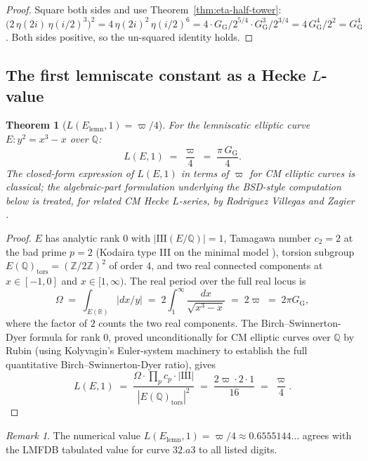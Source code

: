 \documentclass[11pt]{article}
\newtheorem{theorem}{Theorem}[section]
\theoremstyle{definition}
\theoremstyle{remark}
\newtheorem*{remark}{Remark}
\newcommand{\GG}{G_{\!\scriptscriptstyle\mathrm{G}}}
\newcommand{\Z}{\mathbb{Z}}
\newcommand{\Q}{\mathbb{Q}}
\newcommand{\R}{\mathbb{R}}
\newcommand{\Sha}{\mathrm{III}}
\begin{document}
\begin{proof}
Square both sides and use Theorem~\ref{thm:eta-half-tower}:
$\bigl(2\,\eta(2i)\,\eta(i/2)^{3}\bigr)^{2}
   = 4\,\eta(2i)^{2}\,\eta(i/2)^{6}
   = 4 \cdot \GG/2^{5/4} \cdot \GG^{3}/2^{3/4}
   = 4\,\GG^{4}/2^{2} = \GG^{4}$.
Both sides positive, so the un-squared identity holds.
\end{proof}

\subsection{The first lemniscate constant as a Hecke $L$-value}\label{sec:Lvalue}

\begin{theorem}[$L(E_{\mathrm{lemn}}, 1) = \varpi/4$]\label{thm:Lvalue}
For the lemniscatic elliptic curve $E: y^2 = x^3 - x$ over $\Q$:
\[
L(E, 1) \;=\; \frac{\varpi}{4} \;=\; \frac{\pi\,\GG}{4}.
\]
The closed-form expression of $L(E, 1)$ in terms of $\varpi$ for CM elliptic
curves is classical; the algebraic-part formulation underlying the BSD-style
computation below is treated, for related CM Hecke $L$-series, by
Rodriguez Villegas and Zagier \cite{villegas-zagier}.
\end{theorem}

\begin{proof}
$E$ has analytic rank $0$ with $|\Sha(E/\Q)| = 1$, Tamagawa number
$c_{2} = 2$ at the bad prime $p = 2$ (Kodaira type III on the minimal
model \cite[curve 32.a3]{lmfdb}), torsion subgroup
$E(\Q)_{\mathrm{tors}} = (\Z/2\Z)^{2}$ of order $4$, and two real
connected components at $x \in [-1, 0]$ and $x \in [1, \infty)$. The
real period over the full real locus is
\[
\Omega \;=\; \int_{E(\R)} |dx/y|
       \;=\; 2 \int_{1}^{\infty} \frac{dx}{\sqrt{x^{3} - x}}
       \;=\; 2\varpi \;=\; 2\pi\GG,
\]
where the factor of $2$ counts the two real components. The
Birch--Swinnerton-Dyer formula for rank $0$, proved unconditionally
for CM elliptic curves over $\Q$ by Rubin \cite{rubin1991} (using
Kolyvagin's Euler-system machinery to establish the full quantitative
Birch--Swinnerton-Dyer ratio), gives
\[
L(E, 1) \;=\; \frac{\Omega \cdot \prod_{p} c_{p} \cdot |\Sha|}
              {|E(\Q)_{\mathrm{tors}}|^{2}}
       \;=\; \frac{2\varpi \cdot 2 \cdot 1}{16}
       \;=\; \frac{\varpi}{4}.
\]
\end{proof}

\begin{remark}
The numerical value $L(E_{\mathrm{lemn}}, 1) = \varpi/4 \approx 0.6555144\ldots$
agrees with the LMFDB tabulated value for curve $32.a3$ to all listed
digits.
\end{remark}
\end{document}
